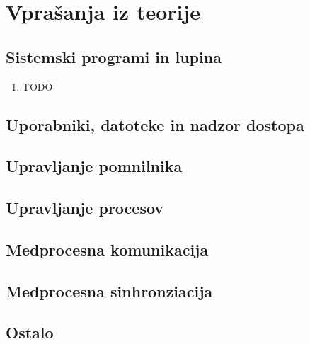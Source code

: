 \chapter{Vprašanja iz teorije}


\section{Sistemski programi in lupina}

\begin{enumerate}
	\item TODO
\end{enumerate}


\section{Uporabniki, datoteke in nadzor dostopa}


\section{Upravljanje pomnilnika}


\section{Upravljanje procesov}


\section{Medprocesna komunikacija}


\section{Medprocesna sinhronziacija}


\section{Ostalo}

